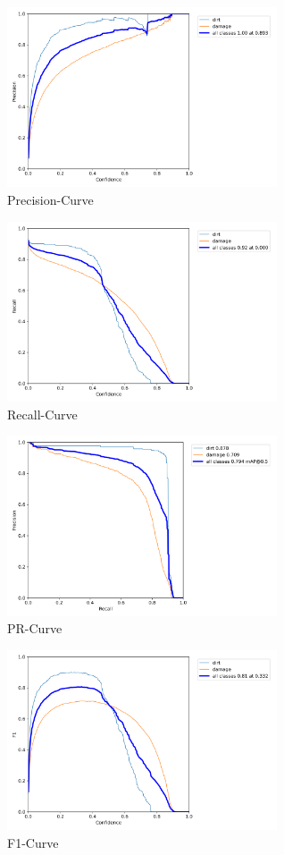 \documentclass[conference]{IEEEtran}
\begin{document}
\begin{figure}[H]
    \centering
    \includegraphics[width=8cm]{Images/YOLOv5s/P_curve.png}
    \caption{Precision-Curve}
\end{figure}
\begin{figure}[H]
    \centering
    \includegraphics[width=8cm]{Images/YOLOv5s/R_curve.png}
    \caption{Recall-Curve}
\end{figure}
\begin{figure}[H]
    \centering
    \includegraphics[width=8cm]{Images/YOLOv5s/PR_curve.png}
    \caption{PR-Curve}
\end{figure}
\begin{figure}[H]
    \centering
    \includegraphics[width=8cm]{Images/YOLOv5s/F1_curve.png}
    \caption{F1-Curve}
\end{figure}
\end{document}
